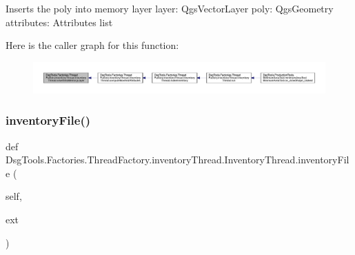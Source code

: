 \begin{DoxyVerb}Inserts the poly into memory layer
layer: QgsVectorLayer
poly: QgsGeometry
attributes: Attributes list
\end{DoxyVerb}
 Here is the caller graph for this function\+:
\nopagebreak
\begin{figure}[H]
\begin{center}
\leavevmode
\includegraphics[width=350pt]{class_dsg_tools_1_1_factories_1_1_thread_factory_1_1inventory_thread_1_1_inventory_thread_a9e240e481365cbe1a7de2450655503e3_icgraph}
\end{center}
\end{figure}
\mbox{\label{class_dsg_tools_1_1_factories_1_1_thread_factory_1_1inventory_thread_1_1_inventory_thread_a63d540736abafb654e777518aeebec6d}} 
\subsubsection{\texorpdfstring{inventory\+File()}{inventoryFile()}}
{\footnotesize\ttfamily def Dsg\+Tools.\+Factories.\+Thread\+Factory.\+inventory\+Thread.\+Inventory\+Thread.\+inventory\+File (\begin{DoxyParamCaption}\item[{}]{self,  }\item[{}]{ext }\end{DoxyParamCaption})}

